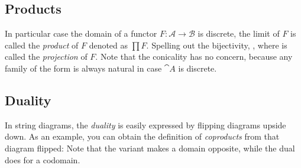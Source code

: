 \subsection{Products}

In particular case the domain of a functor $F : \mathcal{A} \to \mathcal{B}$ is discrete, %
the limit of $F$ is called the \emph{product }of $F$ denoted as $\textstyle\prod F$. Spelling out the bijectivity,
, where \! is called the \emph{projection} of $F$. %
Note that the conicality has no concern, because any family of the form
is always natural in case $\cat A$ is discrete.

\subsection{Duality}

In string diagrams, the \emph{duality} is easily expressed by flipping diagrams upside down. 
As an example, you can obtain the definition of \emph{coproducts} from that diagram flipped:
Note that the variant makes a domain opposite, while the dual does for a codomain.
